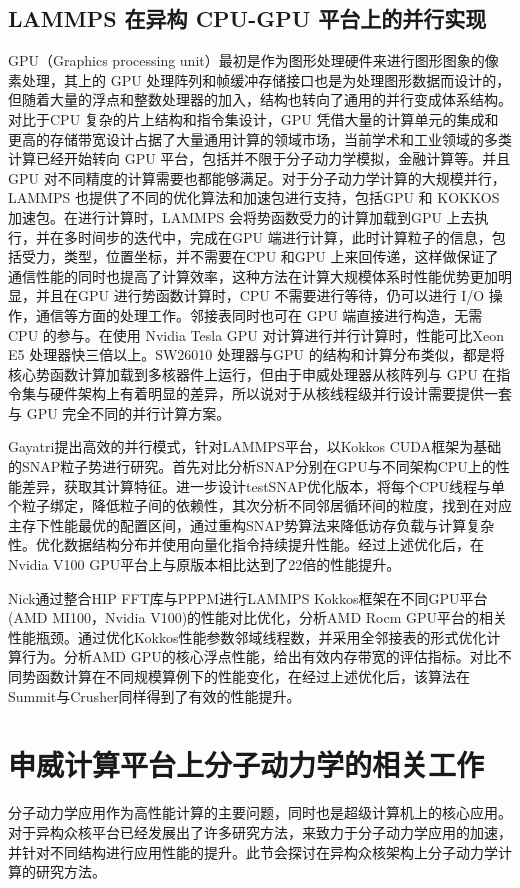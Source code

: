 \subsection{LAMMPS 在异构 CPU-GPU 平台上的并行实现}
GPU（Graphics processing unit）最初是作为图形处理硬件来进行图形图象的像素处理，其上的 GPU 处理阵列和帧缓冲存储接口也是为处理图形数据而设计的，但随着大量的浮点和整数处理器的加入，结构也转向了通用的并行变成体系结构。对比于CPU 复杂的片上结构和指令集设计，GPU 凭借大量的计算单元的集成和更高的存储带宽设计占据了大量通用计算的领域市场，当前学术和工业领域的多类计算已经开始转向 GPU 平台，包括并不限于分子动力学模拟，金融计算等。并且 GPU 对不同精度的计算需要也都能够满足。对于分子动力学计算的大规模并行，LAMMPS 也提供了不同的优化算法和加速包进行支持，包括GPU 和 KOKKOS 加速包。在进行计算时，LAMMPS 会将势函数受力的计算加载到GPU 上去执行，并在多时间步的迭代中，完成在GPU 端进行计算，此时计算粒子的信息，包括受力，类型，位置坐标，并不需要在CPU 和GPU 上来回传递，这样做保证了通信性能的同时也提高了计算效率，这种方法在计算大规模体系时性能优势更加明显，并且在GPU 进行势函数计算时，CPU 不需要进行等待，仍可以进行 I/O 操作，通信等方面的处理工作。邻接表同时也可在 GPU 端直接进行构造，无需 CPU 的参与。在使用 Nvidia Tesla GPU 对计算进行并行计算时，性能可比Xeon E5 处理器快三倍以上。SW26010 处理器与GPU 的结构和计算分布类似，都是将核心势函数计算加载到多核器件上运行，但由于申威处理器从核阵列与 GPU 在指令集与硬件架构上有着明显的差异，所以说对于从核线程级并行设计需要提供一套与 GPU 完全不同的并行计算方案。

Gayatri提出高效的并行模式，针对LAMMPS平台，以Kokkos CUDA框架为基础的SNAP粒子势进行研究。首先对比分析SNAP分别在GPU与不同架构CPU上的性能差异，获取其计算特征。进一步设计testSNAP优化版本，将每个CPU线程与单个粒子绑定，降低粒子间的依赖性，其次分析不同邻居循环间的粒度，找到在对应主存下性能最优的配置区间，通过重构SNAP势算法来降低访存负载与计算复杂性。优化数据结构分布并使用向量化指令持续提升性能。经过上述优化后，在Nvidia V100 GPU平台上与原版本相比达到了22倍的性能提升。

Nick通过整合HIP FFT库与PPPM进行LAMMPS Kokkos框架在不同GPU平台(AMD MI100，Nvidia V100)的性能对比优化，分析AMD Rocm GPU平台的相关性能瓶颈。通过优化Kokkos性能参数邻域线程数，并采用全邻接表的形式优化计算行为。分析AMD GPU的核心浮点性能，给出有效内存带宽的评估指标。对比不同势函数计算在不同规模算例下的性能变化，在经过上述优化后，该算法在Summit与Crusher同样得到了有效的性能提升。

\section{申威计算平台上分子动力学的相关工作}
分子动力学应用作为高性能计算的主要问题，同时也是超级计算机上的核心应用。对于异构众核平台已经发展出了许多研究方法，来致力于分子动力学应用的加速，并针对不同结构进行应用性能的提升。此节会探讨在异构众核架构上分子动力学计算的研究方法。

